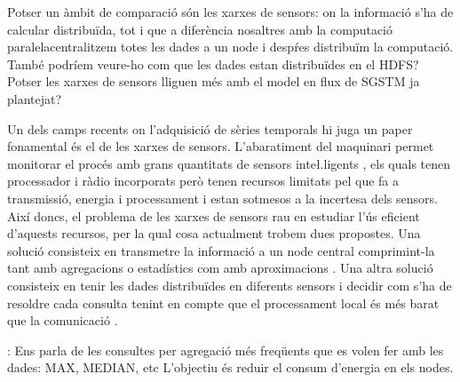 






Potser un àmbit de comparació són les xarxes de sensors: on la informació s'ha de calcular distribuïda, tot i que a diferència nosaltres amb la computació paralelacentralitzem totes les dades a un node i despŕes distribuïm la computació. També podríem veure-ho com que les dades estan distribuïdes en el HDFS?
Potser les xarxes de sensors lliguen més amb el model en flux de SGSTM ja plantejat?



Un dels camps recents on l'adquisició de sèries temporals hi juga un
paper fonamental és el de les xarxes de sensors. L'abaratiment del
maquinari permet monitorar el procés amb grans quantitats de sensors
inte\l.ligents \parencite{jainagrawal05,yaogehrke02}, els quals tenen
processador i ràdio incorporats però tenen recursos limitats pel que
fa a transmissió, energia i processament i estan sotmesos a la
incertesa dels sensors. Així doncs, el problema de les xarxes de
sensors rau en estudiar l'ús eficient d'aquests recursos, per la qual
cosa actualment trobem dues propostes.  Una solució consisteix en
transmetre la informació a un node central comprimint-la tant amb
agregacions o estadístics com amb
aproximacions \parencite{deligiannakis07}.  Una altra solució
consisteix en tenir les dades distribuïdes en diferents sensors i
decidir com s'ha de resoldre cada consulta tenint en compte que el
processament local és més barat que la
comunicació \parencite{yaogehrke02,gehrkemadden04,bonnet01,kim12:aggregate_sensor_networks}.



:
Ens parla de les consultes per agregació més freqüents que es volen fer amb les dades: MAX, MEDIAN, etc L'objectiu és reduir el consum d'energia en els nodes.
